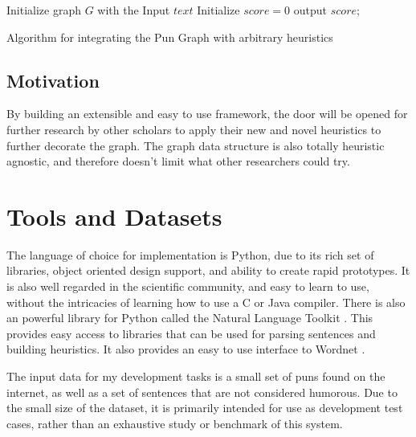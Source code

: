 \begin{algorithm}[h]
\begin{mdframed}
 Initialize graph $G$ with the Input $text$\;
 Initialize $score = 0$\;
  output $score$;
   \end{mdframed}
   \caption{Algorithm for integrating the Pun Graph with arbitrary heuristics}
 \label{graphalgorithm}
\end{algorithm}

\subsection{Motivation}

By building an extensible and easy to use framework, the door will be opened for further research by other scholars to apply their new and novel heuristics to further decorate the graph. The graph data structure is also totally heuristic agnostic, and therefore doesn't limit what other researchers could try.

\section{Tools and Datasets}

The language of choice for implementation is Python, due to its rich set of libraries, object oriented design support, and ability to create rapid prototypes. It is also well regarded in the scientific community, and easy to learn to use, without the intricacies of learning how to use a C or Java compiler. There is also an powerful library for Python called the Natural Language Toolkit \cite{NLTK}. This provides easy access to libraries that can be used for parsing sentences and building heuristics. It also provides an easy to use interface to Wordnet \cite{wordnet}.

The input data for my development tasks is a small set of puns found on the internet, as well as a set of sentences that are not considered humorous. Due to the small size of the dataset, it is primarily intended for use as development test cases, rather than an exhaustive study or benchmark of this system.

